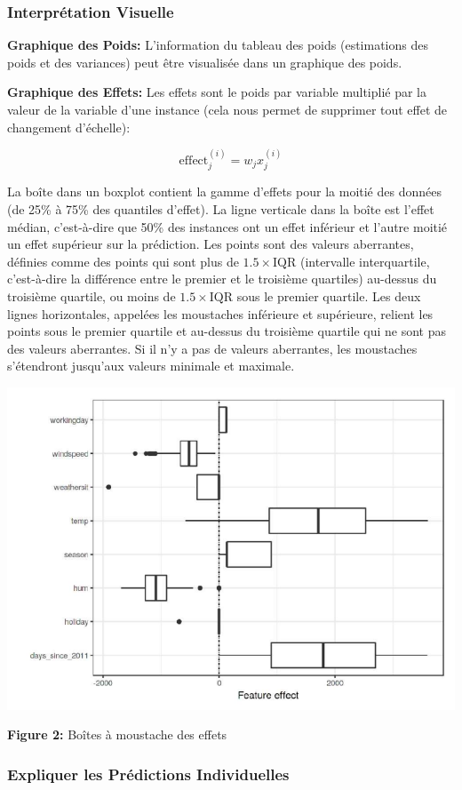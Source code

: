 \subsubsection{Interprétation Visuelle}

\textbf{Graphique des Poids:} L'information du tableau des poids (estimations des poids et des variances) peut être visualisée dans un graphique des poids.

\textbf{Graphique des Effets:} Les effets sont le poids par variable multiplié par la valeur de la variable d'une instance (cela nous permet de supprimer tout effet de changement d'échelle):

\[
\text{effect}_{j}^{(i)} = w_{j}x_{j}^{(i)}
\]

La boîte dans un boxplot contient la gamme d'effets pour la moitié des données (de 25\% à 75\% des quantiles d'effet).
La ligne verticale dans la boîte est l'effet médian, c'est-à-dire que 50\% des instances ont un effet inférieur et l'autre moitié un effet supérieur sur la prédiction.
Les points sont des valeurs aberrantes, définies comme des points qui sont plus de \(1.5 \times \text{IQR}\) (intervalle interquartile, c'est-à-dire la différence entre le premier et le troisième quartiles) au-dessus du troisième quartile, ou moins de \(1.5 \times \text{IQR}\) sous le premier quartile.
Les deux lignes horizontales, appelées les moustaches inférieure et supérieure, relient les points sous le premier quartile et au-dessus du troisième quartile qui ne sont pas des valeurs aberrantes.
Si il n'y a pas de valeurs aberrantes, les moustaches s'étendront jusqu'aux valeurs minimale et maximale.

\hspace{3cm}
\includegraphics[width=0.5\linewidth]{Images/effect_plot.png} 
\begin{center}
    \textbf{Figure 2:} Boîtes à moustache des effets 
    \vspace{1cm}
\end{center}

\subsubsection{Expliquer les Prédictions Individuelles}

